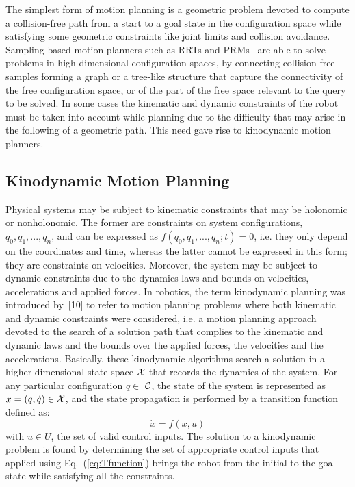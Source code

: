 \documentclass[twocolumn]{svjour3}          %
\newcommand {\Cs}{\hbox{{$\cal C$}}}                %
\begin{document}
The simplest form of motion planning is a geometric problem  devoted to compute a collision-free path from a start to a goal state in the configuration space while satisfying some geometric 
constraints like joint limits and collision avoidance. Sampling-based motion planners such as RRTs and PRMs~\cite{kavraki1996} are able to solve problems in high dimensional configuration spaces, by 
connecting collision-free samples forming a graph or a tree-like structure that capture the connectivity of the free configuration space, or of the part of the free space relevant to the query to be 
solved. In some cases the kinematic and dynamic constraints of the robot must be taken into account while planning due to the difficulty that may arise in the following of a geometric path. This need 
gave rise to kinodynamic motion planners.

\subsection{Kinodynamic Motion Planning}
Physical systems may be subject to kinematic constraints that may be holonomic or nonholonomic. The former are 
constraints on system configurations, $q_0, q_1, . . ., q_n$, and can be expressed as \hbox{$f (q_0, q_1, . . ., q_n; t) = 0$}, 
i.e. they only depend on the coordinates and time, whereas the latter cannot be expressed in this form; they are constraints on velocities. Moreover, the system may be subject to dynamic constraints 
due to the dynamics laws and bounds on velocities, accelerations and applied forces.
In robotics, the term kinodynamic planning was introduced by~[10] to refer to motion planning problems where both kinematic and dynamic constraints were considered, i.e. a motion planning  approach 
devoted to the search of a solution path that complies to the kinematic and dynamic laws and the bounds over the applied forces, the velocities and the accelerations.
Basically, these kinodynamic algorithms search a solution in a higher dimensional state space $\cal X$ that records the dynamics of the system. For any particular configuration $q \in $ \Cs, the state 
of the system is represented as $x= (q,\dot{q})\in \cal X$, and the state propagation is performed by a transition function defined as:
\begin{equation}\label{eq:Tfunction}
 \dot{x}=f(x,u)
\end{equation}
with $u\in U$, the  set of valid control inputs. The solution to a kinodynamic problem is found by determining the set of appropriate control inputs that applied using Eq.~(\ref{eq:Tfunction}) brings 
the robot from the initial to the goal state while satisfying all the constraints.
\end{document}
